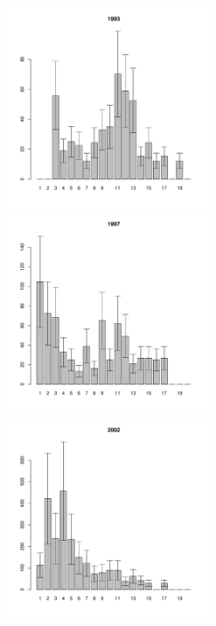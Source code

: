 \begin{figure}[h]
\begin{multicols}{3}
\hfill
\includegraphics[width=60mm]{../White_Sea/Luvenga_II_razrez/zostera_zone_1993_.pdf}
\hfill
\includegraphics[width=60mm]{../White_Sea/Luvenga_II_razrez/zostera_zone_1997_.pdf}
\hfill
\includegraphics[width=60mm]{../White_Sea/Luvenga_II_razrez/zostera_zone_2002_.pdf}
\end{multicols}



\end{figure}
